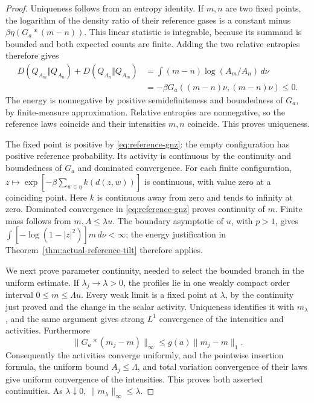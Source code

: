 \documentclass[11pt]{article}
\theoremstyle{remark}\newtheorem{remark}[theorem]{Remark}
\begin{document}
\begin{proof}
Uniqueness follows from an entropy identity.  If $m,n$ are two fixed
points, the logarithm of the density ratio of their reference gases is
a constant minus $\beta\eta(G_a*(m-n))$.  This linear statistic is
integrable, because its summand is bounded and both expected counts are
finite.  Adding the two relative entropies therefore gives
\begin{align*}
 D(Q_{A_m}\Vert Q_{A_n})+D(Q_{A_n}\Vert Q_{A_m})
 &=\int(m-n)\log(A_m/A_n)\,d\nu\\
 &=-\beta G_a((m-n)\nu,(m-n)\nu)\le0.
\end{align*}
The energy is nonnegative by positive semidefiniteness and boundedness
of $G_a$, by finite-measure approximation.  Relative entropies are
nonnegative, so the reference laws coincide and their intensities
$m,n$ coincide.  This proves uniqueness.

The fixed point is positive by \eqref{eq:reference-gnz}: the empty
configuration has positive reference probability.  Its activity is
continuous by the continuity and boundedness of $G_a$ and dominated
convergence.  For each finite configuration,
$z\mapsto\exp[-\beta\sum_{w\in\eta}k(d(z,w))]$ is continuous,
with value zero at a coinciding point.  Here $k$ is continuous away
from zero and tends to infinity at zero.  Dominated convergence in
\eqref{eq:reference-gnz} proves continuity of $m$.
Finite mass follows from $m,A\le\lambda u$.  The boundary asymptotic
of $u$, with $p>1$, gives
$\int[-\log(1-|z|^2)]m\,d\nu<\infty$; the energy justification in
Theorem~\ref{thm:actual-reference-tilt} therefore applies.

We next prove parameter continuity, needed to select the bounded
branch in the uniform estimate.  If $\lambda_j\to\lambda>0$, the
profiles lie in one weakly compact order interval
$0\le m\le\Lambda u$.  Every weak limit is a fixed point at
$\lambda$, by the continuity just proved and the change in the scalar
activity.  Uniqueness identifies it with $m_\lambda$, and the same
argument gives strong $L^1$ convergence of the intensities and activities.
Furthermore
\[
 \|G_a*(m_j-m)\|_\infty\le g(a)\|m_j-m\|_1.
\]
Consequently the activities converge uniformly, and the pointwise
insertion formula, the uniform bound $A_j\le\Lambda$, and total
variation convergence of their laws give uniform convergence of the
intensities.  This proves both asserted continuities.  As
$\lambda\downarrow0$, $\|m_\lambda\|_\infty\le\lambda$.


\end{proof}
\end{document}
